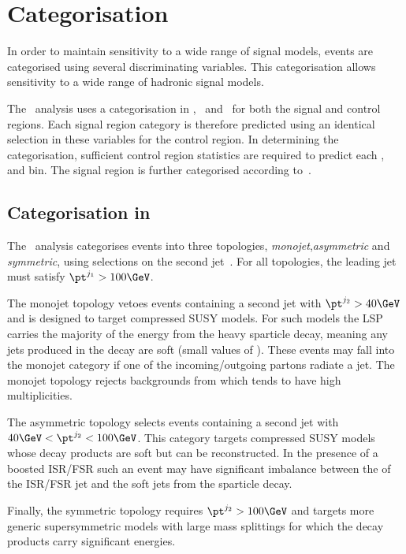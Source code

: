 \section{Categorisation}
\label{sec:cat}
In order to maintain sensitivity to a wide range of signal models, events are categorised using
several discriminating variables. This categorisation allows sensitivity to a wide range of 
hadronic signal models. 

The \alphat~analysis uses a categorisation in \njet, \nb~and \scalht~for both 
the signal and control regions. Each signal region category is therefore predicted using an identical 
selection in these variables for the control region. In determining the categorisation, 
sufficient control region statistics are required to predict each \njet, \nb and \scalht bin.
The signal region is further categorised according to~\mht. 

\subsection{Categorisation in \njet}

The \alphat~analysis categorises events into three topologies, \emph{monojet},\emph{asymmetric} 
and \emph{symmetric}, using selections on the second jet~\pt. For all topologies, the leading
jet must satisfy $\pt^{j_1} > 100 \GeV$.  

The monojet topology vetoes events containing a second 
jet with $\pt^{j_2} > 40 \GeV$ and is designed to target compressed SUSY models. For such models the 
LSP carries the majority of the energy from the heavy sparticle decay, meaning any jets produced 
in the decay are soft (small values of \pt). These events may fall into the monojet category if
one of the incoming/outgoing partons radiate a jet. The monojet topology rejects backgrounds from 
\ttbar which tends to have high \njet multiplicities. 

The asymmetric topology selects events containing a second jet with $40 \GeV < \pt^{j_2} < 100 \GeV$.
This category targets compressed SUSY models whose decay products are soft but can be reconstructed.
In the presence of a boosted ISR/FSR such an event may have significant imbalance between
the \pt of the ISR/FSR jet and the soft jets from the sparticle decay.

Finally, the symmetric topology requires $\pt^{j_2} > 100 \GeV$ and targets more
generic supersymmetric models with large mass splittings 
for which the decay products carry significant energies.


